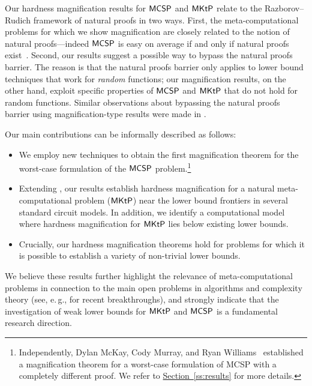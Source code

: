 \documentclass[11pt]{article}
\numberwithin{equation}{section}
\theoremstyle{definition}
\theoremstyle{plain}
\newcommand{\eg}{e.\,g.}
\newcommand{\expref}[2]{\hyperref[#2]{#1~\ref{#2}}}
\newcommand{\MCSP}{\ensuremath{{\sf MCSP}}\xspace}
\newcommand{\MKtP}{\ensuremath{{\sf MKtP}}\xspace}
\begin{document}
Our hardness magnification results for \MCSP and %
\MKtP %
relate to the Razborov--Rudich framework of natural proofs in two ways. First, the meta-computational problems for which we show magnification are closely related to the notion of natural proofs---indeed \MCSP is easy on average if and only if natural proofs exist~\cite{DBLP:conf/coco/HiraharaS17}. Second, our results suggest a possible way to bypass the natural proofs barrier. The reason is that the natural proofs barrier only applies to lower bound techniques
that work for \emph{random} functions; our magnification results, on the other hand, exploit specific properties of \MCSP and %
\MKtP %
that do not hold for random functions. Similar observations about bypassing the natural proofs barrier using magnification-type results were made
in \cite{DBLP:journals/jacm/AllenderK10, OS18}.

Our main contributions can be informally described as follows:


\begin{itemize}
\item[(\emph{i})] We employ new techniques to obtain the first magnification theorem for the worst-case formulation of the \MCSP problem.\footnote{Independently, Dylan McKay, Cody Murray, and Ryan Williams~\cite{STOC_paper} established a magnification theorem for a worst-case formulation of MCSP with a completely different proof. We refer to \expref{Section}{ss:results} for more details.}  
\item[(\emph{ii})] Extending \cite[Theorem 3]{OS18}, our results establish hardness magnification for a natural meta-computational problem (\MKtP) near the lower bound frontiers in several standard circuit models. In addition, we identify a computational model where hardness magnification for \MKtP lies below existing lower bounds. 
\item[(\emph{iii})] Crucially, our hardness magnification theorems hold for problems for which it is possible to establish a variety of non-trivial lower bounds.
\end{itemize}

We believe these results further highlight the relevance of meta-computational problems in connection to the main open problems in algorithms and complexity theory (see, \eg, \cite{DBLP:journals/jacm/Williams14, DBLP:conf/coco/CarmosinoIKK16} for recent breakthroughs), and strongly indicate that the investigation of weak lower bounds for $\MKtP$ and $\MCSP$ is a fundamental research direction.  
\end{document}
